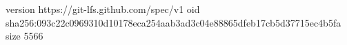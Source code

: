 version https://git-lfs.github.com/spec/v1
oid sha256:093c22c0969310d10178eca254aab3ad3c04e88865dfeb17cb5d37715ec4b5fa
size 5566
